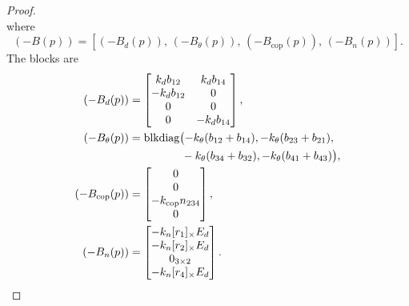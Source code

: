 \documentclass[letterpaper,journal]{IEEEtran}
\theoremstyle{plain}
\theoremstyle{definition}
\theoremstyle{remark}
\begin{document}
\begin{proof}
\begin{equation}
\label{eq:raw-velocity}
\end{equation}
where
\begin{equation}
(-B(p))=[(-B_d(p)),\,(-B_\theta(p)),\,(-B_{\mathrm{cop}}(p)),\,(-B_n(p))].
\label{eq:B-blocks}
\end{equation}
The blocks are
\begin{align}
(-B_d(p))&=
\begin{bmatrix}
k_d b_{12} & k_d b_{14}\\
-k_d b_{12} & 0\\
0&0\\
0&-k_d b_{14}
\end{bmatrix},\label{eq:Bd-def}\\
(-B_\theta(p))&=\operatorname{blkdiag}\bigl(
-k_\theta(b_{12}+b_{14}),
-k_\theta(b_{23}+b_{21}),\notag\\
&\hspace{4.7em}
-k_\theta(b_{34}+b_{32}),
-k_\theta(b_{41}+b_{43})\bigr),\label{eq:Btheta-def}\\
(-B_{\mathrm{cop}}(p))&=
\begin{bmatrix}
0\\0\\-k_{\mathrm{cop}}n_{234}\\0
\end{bmatrix},\label{eq:Bcop-def}\\
(-B_n(p))&=
\begin{bmatrix}
-k_n[r_1]_\times E_d\\
-k_n[r_2]_\times E_d\\
0_{3\times2}\\
-k_n[r_4]_\times E_d
\end{bmatrix}.\label{eq:Bn-def}
\end{align}




\end{proof}
\end{document}

